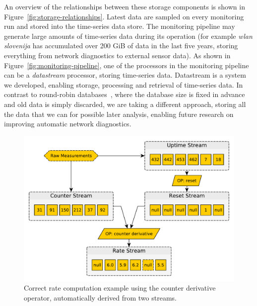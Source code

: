 \documentclass[5p,sort&compress]{elsarticle}
\newcommand{\wlanslovenija}{\textit{wlan slovenija}}
\begin{document}
An overview of the relationships between these storage components is shown in Figure~\ref{fig:storage-relationships}.
Latest data are sampled on every monitoring run and stored into the time-series data store.
The monitoring pipeline may generate large amounts of time-series data during its operation (for example \wlanslovenija{} has accumulated over 200 GiB of data in the last five years, storing everything from network diagnostics to external sensor data).
As shown in Figure~\ref{fig:monitoring-pipeline}, one of the processors in the monitoring pipeline can be a \textit{datastream} processor, storing time-series data.
Datastream is a system we developed, enabling storage, processing and retrieval of time-series data.
In contrast to round-robin databases~\cite{Oetiker_1999}, where the database size is fixed in advance and old data is simply discarded, we are taking a different approach, storing all the data that we can for possible later analysis, enabling future research on improving automatic network diagnostics.

\begin{figure}
  \centering
  \includegraphics[scale=0.4]{figures/datastream-counter-reset.pdf}
  \caption{Correct rate computation example using the counter derivative operator, automatically derived from two streams.}
  \label{fig:datastream-counter-reset}
\end{figure}
\end{document}
